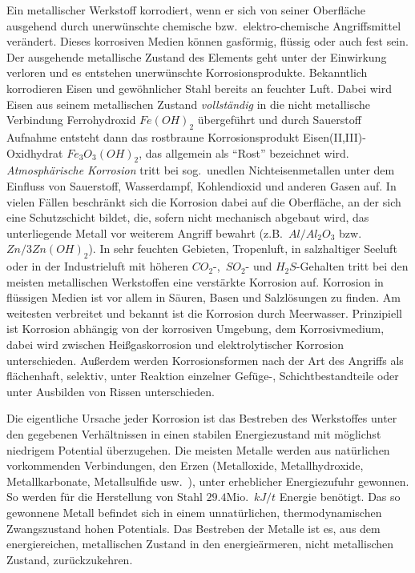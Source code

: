 \documentclass[12pt,a4paper,bibliography=totocnumbered,listof=totocnumbered,fleqn]{scrartcl}
\begin{document}
Ein metallischer Werkstoff korrodiert, wenn er sich von seiner Oberfläche ausgehend durch unerwünschte chemische bzw.\ elektro-chemische Angriffsmittel verändert. Dieses korrosiven Medien können gasförmig, flüssig oder auch fest sein. Der ausgehende metallische Zustand des Elements geht unter der Einwirkung verloren und es entstehen unerwünschte Korrosionsprodukte. Bekanntlich korrodieren Eisen und gewöhnlicher Stahl bereits an feuchter Luft. Dabei wird Eisen aus seinem metallischen Zustand \emph{vollständig} in die nicht metallische Verbindung Ferrohydroxid $Fe(OH)_{2}$ übergeführt und durch Sauerstoff Aufnahme entsteht dann das rostbraune Korrosionsprodukt Eisen(II,III)-Oxidhydrat $Fe_{3}O_{3}(OH)_{2}$, das allgemein als \enquote{Rost} bezeichnet wird. \emph{Atmosphärische Korrosion} tritt bei sog.\ unedlen Nichteisenmetallen unter dem Einfluss von Sauerstoff, Wasserdampf, Kohlendioxid und anderen Gasen auf. In vielen Fällen beschränkt sich die Korrosion dabei auf die Oberfläche, an der sich eine Schutzschicht bildet, die, sofern nicht mechanisch abgebaut wird, das unterliegende Metall vor weiterem Angriff bewahrt (z.B.\ $Al/Al_{2}O_{3}$ bzw.\ $Zn/3Zn(OH)_{2}$). In sehr feuchten Gebieten, Tropenluft, in salzhaltiger Seeluft oder in der Industrieluft mit höheren $CO_{2}$-,~$SO_{2}$- und $H_{2}S$-Gehalten tritt bei den meisten metallischen Werkstoffen eine verstärkte Korrosion auf. Korrosion in flüssigen Medien ist vor allem in Säuren, Basen und Salzlösungen zu finden. Am weitesten verbreitet und bekannt ist die Korrosion durch Meerwasser. Prinzipiell ist Korrosion abhängig von der korrosiven Umgebung, dem Korrosivmedium, dabei wird zwischen Heißgaskorrosion und elektrolytischer Korrosion unterschieden. Außerdem werden Korrosionsformen nach der Art des Angriffs als flächenhaft, selektiv, unter Reaktion einzelner Gefüge-, Schichtbestandteile oder unter Ausbilden von Rissen unterschieden.

Die eigentliche Ursache jeder Korrosion ist das Bestreben des Werkstoffes unter den gegebenen Verhältnissen in einen stabilen Energiezustand mit möglichst niedrigem Potential überzugehen.
Die meisten Metalle werden aus natürlichen vorkommenden Verbindungen, den Erzen (Metalloxide, Metallhydroxide, Metallkarbonate, Metallsulfide usw.\ ), unter erheblicher Energiezufuhr gewonnen.
So werden für die Herstellung von Stahl $29.4$Mio.\ $kJ/t$ Energie benötigt.
Das so gewonnene Metall befindet sich in einem unnatürlichen, thermodynamischen Zwangszustand hohen Potentials.
Das Bestreben der Metalle ist es, aus dem energiereichen, metallischen Zustand in den energieärmeren, nicht metallischen Zustand, zurückzukehren.
\end{document}
